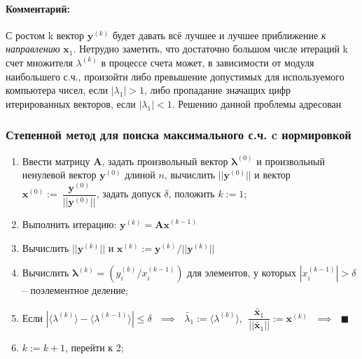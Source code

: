 \paragraph{Комментарий:} С ростом k вектор $\mathbf{y}^{(k)}$ будет давать всё лучшее и лучшее приближение {\it к направлению} $\mathbf{x}_1$. Нетрудно заметить, что достаточно большом числе итераций k счет множителя  $\lambda^{(k)}$ в процессе счета может, в зависимости от модуля наибольшего с.ч., произойти либо превышение допустимых для используемого компьютера чисел, если $|\lambda_1| >1$, либо пропадание значащих цифр итерированных векторов, если $|\lambda_1| < 1$. Решению данной проблемы адресован

\subsubsection{Степенной метод для поиска максимального с.ч. c нормировкой}
\begin{enumerate}
    \item Ввести матрицу $\mathbf{A}$, задать произвольный вектор $\mathbf{\lambda}^{(0)}$ и произвольный ненулевой вектор $\mathbf{y}^{(0)}$ длиной $n$, вычислить $||\mathbf{y}^{(0)}||$ и вектор $\mathbf{x}^{(0)}:=~\dfrac{\mathbf{y}^{(0)}}{||\mathbf{y}^{(0)}||}$, задать допуск $\delta$, положить $k:=1$;

    \item Выполнить итерацию: $\mathbf{y}^{(k)} = \mathbf{Ax}^{(k-1)}$

    \item Вычислить $||\mathbf{y}^{(k)}||$ и $\mathbf{x}^{(k)} := \mathbf{y}^{(k)}/||\mathbf{y}^{(k)}||$

    \item Вычислить $\mathbf{\lambda}^{(k)} = \left( y^{(k)}_i / x^{(k-1)}_i \right)$ для элементов, у которых $ |x^{(k-1)}_i| > \delta$ -- поэлементное деление;

    \item Если $|\langle \lambda^{(k)}\rangle-\langle\lambda^{(k-1)}\rangle| \le \delta
    ~~~ \implies ~~~
    \tilde{\lambda_1} := \langle\lambda^{(k)} \rangle, ~~
    \dfrac{\tilde{\mathbf{x}_1}}{||\tilde{\mathbf{x}_1}||} := \mathbf{x}^{(k)} ~~~
    \implies ~~~ \blacksquare$

    \item $k:= k+1$, перейти к 2;
\end{enumerate}

